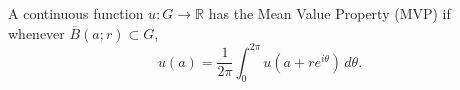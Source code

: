 A continuous function $u: G \to \mathbb{R}$ has the Mean Value Property (MVP) if whenever $\overline{B}(a; r) \subset G$,
$$u(a) = \frac{1}{2\pi} \int_0^{2\pi} u(a + re^{i\theta}) \, d\theta.$$
